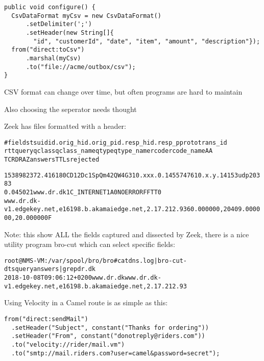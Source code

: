 \documentclass[Screen16to9,17pt]{foils}
\begin{document}

\begin{verbatim}
public void configure() {
  CsvDataFormat myCsv = new CsvDataFormat()
      .setDelimiter(';')
      .setHeader(new String[]{
        "id", "customerId", "date", "item", "amount", "description"});
  from("direct:toCsv")
      .marshal(myCsv)
      .to("file://acme/outbox/csv");
}
\end{verbatim}

\begin{list2}
\item CSV format can change over time, but often programs are hard to maintain
\item Also choosing the seperator needs thought
\end{list2}


Zeek has files formatted with a header:
\begin{alltt}\footnotesize
#fields ts      uid     id.orig_h       id.orig_p       id.resp_h       id.resp_p       proto   trans_id
        rtt     query   qclass  qclass_name     qtype   qtype_name      rcode   rcode_name      AA
        TC      RD      RA      Z       answers TTLs    rejected

1538982372.416180	CD12Dc1SpQm42QW4G3	10.xxx.0.145	57476	10.x.y.141	53	udp	20383
	0.045021	www.dr.dk	1	C_INTERNET	1	A	0	NOERROR	F	F	T	T	0
   www.dr.dk-v1.edgekey.net,e16198.b.akamaiedge.net,2.17.212.93	60.000000,20409.000000,20.000000	F
\end{alltt}

Note: this show ALL the fields captured and dissected by Zeek, there is a nice utility program bro-cut which can select specific fields:

\begin{alltt}\small
root@NMS-VM:/var/spool/bro/bro# cat dns.log | bro-cut -d ts query answers | grep dr.dk
2018-10-08T09:06:12+0200	www.dr.dk	www.dr.dk-v1.edgekey.net,e16198.b.akamaiedge.net,2.17.212.93
\end{alltt}







Using Velocity in a Camel route is as simple as this:

\begin{verbatim}
from("direct:sendMail")
  .setHeader("Subject", constant("Thanks for ordering"))
  .setHeader("From", constant("donotreply@riders.com"))
  .to("velocity://rider/mail.vm")
  .to("smtp://mail.riders.com?user=camel&password=secret");
\end{verbatim}
\end{document}
